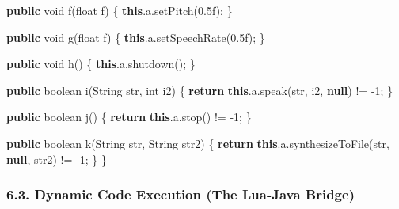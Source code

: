 \documentclass[
]{article}
\newenvironment{Shaded}{}{}
\newcommand{\BuiltInTok}[1]{\textcolor[rgb]{0.00,0.50,0.00}{#1}}
\newcommand{\ControlFlowTok}[1]{\textcolor[rgb]{0.00,0.44,0.13}{\textbf{#1}}}
\newcommand{\DataTypeTok}[1]{\textcolor[rgb]{0.56,0.13,0.00}{#1}}
\newcommand{\DecValTok}[1]{\textcolor[rgb]{0.25,0.63,0.44}{#1}}
\newcommand{\FloatTok}[1]{\textcolor[rgb]{0.25,0.63,0.44}{#1}}
\newcommand{\FunctionTok}[1]{\textcolor[rgb]{0.02,0.16,0.49}{#1}}
\newcommand{\KeywordTok}[1]{\textcolor[rgb]{0.00,0.44,0.13}{\textbf{#1}}}
\newcommand{\NormalTok}[1]{#1}
\newcommand{\OperatorTok}[1]{\textcolor[rgb]{0.40,0.40,0.40}{#1}}
\begin{document}
\begin{Shaded}
\begin{Highlighting}[]
    \KeywordTok{public} \DataTypeTok{void} \FunctionTok{f}\OperatorTok{(}\DataTypeTok{float}\NormalTok{ f}\OperatorTok{)} \OperatorTok{\{}
        \KeywordTok{this}\OperatorTok{.}\FunctionTok{a}\OperatorTok{.}\FunctionTok{setPitch}\OperatorTok{(}\FloatTok{0.5f}\OperatorTok{);}
    \OperatorTok{\}}

    \KeywordTok{public} \DataTypeTok{void} \FunctionTok{g}\OperatorTok{(}\DataTypeTok{float}\NormalTok{ f}\OperatorTok{)} \OperatorTok{\{}
        \KeywordTok{this}\OperatorTok{.}\FunctionTok{a}\OperatorTok{.}\FunctionTok{setSpeechRate}\OperatorTok{(}\FloatTok{0.5f}\OperatorTok{);}
    \OperatorTok{\}}

    \KeywordTok{public} \DataTypeTok{void} \FunctionTok{h}\OperatorTok{()} \OperatorTok{\{}
        \KeywordTok{this}\OperatorTok{.}\FunctionTok{a}\OperatorTok{.}\FunctionTok{shutdown}\OperatorTok{();}
    \OperatorTok{\}}

    \KeywordTok{public} \DataTypeTok{boolean} \FunctionTok{i}\OperatorTok{(}\BuiltInTok{String}\NormalTok{ str}\OperatorTok{,} \DataTypeTok{int}\NormalTok{ i2}\OperatorTok{)} \OperatorTok{\{}
        \ControlFlowTok{return} \KeywordTok{this}\OperatorTok{.}\FunctionTok{a}\OperatorTok{.}\FunctionTok{speak}\OperatorTok{(}\NormalTok{str}\OperatorTok{,}\NormalTok{ i2}\OperatorTok{,} \KeywordTok{null}\OperatorTok{)} \OperatorTok{!=} \OperatorTok{{-}}\DecValTok{1}\OperatorTok{;}
    \OperatorTok{\}}

    \KeywordTok{public} \DataTypeTok{boolean} \FunctionTok{j}\OperatorTok{()} \OperatorTok{\{}
        \ControlFlowTok{return} \KeywordTok{this}\OperatorTok{.}\FunctionTok{a}\OperatorTok{.}\FunctionTok{stop}\OperatorTok{()} \OperatorTok{!=} \OperatorTok{{-}}\DecValTok{1}\OperatorTok{;}
    \OperatorTok{\}}

    \KeywordTok{public} \DataTypeTok{boolean} \FunctionTok{k}\OperatorTok{(}\BuiltInTok{String}\NormalTok{ str}\OperatorTok{,} \BuiltInTok{String}\NormalTok{ str2}\OperatorTok{)} \OperatorTok{\{}
        \ControlFlowTok{return} \KeywordTok{this}\OperatorTok{.}\FunctionTok{a}\OperatorTok{.}\FunctionTok{synthesizeToFile}\OperatorTok{(}\NormalTok{str}\OperatorTok{,} \KeywordTok{null}\OperatorTok{,}\NormalTok{ str2}\OperatorTok{)} \OperatorTok{!=} \OperatorTok{{-}}\DecValTok{1}\OperatorTok{;}
    \OperatorTok{\}}
\OperatorTok{\}}
\end{Highlighting}
\end{Shaded}

\subsubsection{\texorpdfstring{\textbf{6.3. Dynamic Code Execution (The
Lua-Java
Bridge)}}{6.3. Dynamic Code Execution (The Lua-Java Bridge)}}\label{63-dynamic-code-execution-the-lua-java-bridge}
\end{document}

